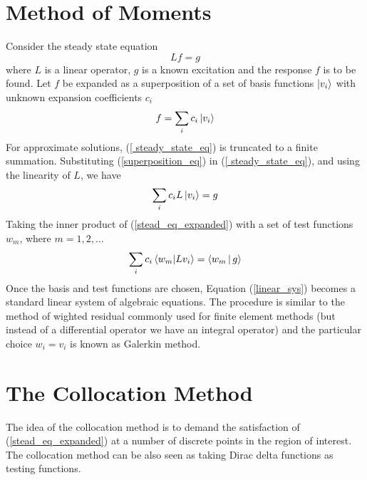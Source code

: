 \documentclass{tufte-handout}
\begin{document}
 \section{Method of Moments}
 Consider the steady state equation
 \begin{equation}\label{ steady_state_eq}
 L f = g
 \end{equation}
 where $L$ is a linear operator, $g$ is a known excitation and the response $f$ is to be found. Let $f$ be expanded as a superposition of a set of basis functions $\Ket{v_i}$ with unknown expansion coefficients $c_i$
 \begin{equation}\label{superposition_eq}
f = \sum_i c_i \Ket{v_i} 
 \end{equation}
 For approximate solutions, (\ref{ steady_state_eq}) is truncated to a finite summation. Substituting (\ref{superposition_eq}) in (\ref{ steady_state_eq}), and using the linearity of $L$, we have
 \begin{equation} \label{stead_eq_expanded}
   \sum_i c_i L \Ket{v_i} = g
 \end{equation}  
 Taking the inner product of  (\ref{stead_eq_expanded}) with a set of test functions $w_m$, where $  m = 1,2, \dots $  
 \begin{equation}\label{linear_sys}
    \sum_i c_i  \braket{w_m |L v_i} = \Braket{w_m | g}
 \end{equation}
 Once the basis and test functions are chosen, Equation (\ref{linear_sys}) becomes a standard linear system of algebraic equations. The procedure is similar to  the method of wighted residual commonly used for finite element methods (but instead of a differential operator we have an integral operator) and the particular choice $w_i = v_i$ is known as Galerkin method.  
 \section{The Collocation Method}
 The idea of the collocation method is to demand the satisfaction of (\ref{stead_eq_expanded}) at a number of discrete points in the region of interest. The collocation method can be also seen as taking Dirac delta functions as testing functions.
 
\end{document}
